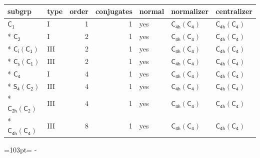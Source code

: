 \documentclass[10pt,a4paper]{article}
\newcommand{\needspace}[1]{\par\penalty-100\begingroup\dimen0=#1\relax\dimen2=\pagegoal
  \advance\dimen2-\pagetotal\ifdim\dimen0>\dimen2\relax\ifdim\dimen2>0pt\vfil\break\fi\fi
  \endgroup}
\numberwithin{equation}{section}
\newcommand{\grp}[1]{\mathsf{#1}}
\begin{document}
{\small\begin{longtable}{@{}llrrlll@{}}\toprule
subgrp & type & order & conjugates & normal & normalizer & centralizer\\\midrule\endhead
\bottomrule\endfoot\endlastfoot
\href{../../../rotation/data/pdf/C1.pdf}{$\grp{C_{1}}$} & I & 1 & 1 & yes & \href{C4h-C4.pdf}{$\grp{C_{4h}}(\grp{C_{4}})$} & \href{C4h-C4.pdf}{$\grp{C_{4h}}(\grp{C_{4}})$}\\*
\href{../../../rotation/data/pdf/C2.pdf}{$\grp{C_{2}}$} & I & 2 & 1 & yes & \href{C4h-C4.pdf}{$\grp{C_{4h}}(\grp{C_{4}})$} & \href{C4h-C4.pdf}{$\grp{C_{4h}}(\grp{C_{4}})$}\\*
\href{S2-C1.pdf}{$\grp{C_{i}}(\grp{C_{1}})$} & III & 2 & 1 & yes & \href{C4h-C4.pdf}{$\grp{C_{4h}}(\grp{C_{4}})$} & \href{C4h-C4.pdf}{$\grp{C_{4h}}(\grp{C_{4}})$}\\*
\href{C1v-C1.pdf}{$\grp{C_{s}}(\grp{C_{1}})$} & III & 2 & 1 & yes & \href{C4h-C4.pdf}{$\grp{C_{4h}}(\grp{C_{4}})$} & \href{C4h-C4.pdf}{$\grp{C_{4h}}(\grp{C_{4}})$}\\*
\href{../../../rotation/data/pdf/C4.pdf}{$\grp{C_{4}}$} & I & 4 & 1 & yes & \href{C4h-C4.pdf}{$\grp{C_{4h}}(\grp{C_{4}})$} & \href{C4h-C4.pdf}{$\grp{C_{4h}}(\grp{C_{4}})$}\\*
\href{S4-C2.pdf}{$\grp{S_{4}}(\grp{C_{2}})$} & III & 4 & 1 & yes & \href{C4h-C4.pdf}{$\grp{C_{4h}}(\grp{C_{4}})$} & \href{C4h-C4.pdf}{$\grp{C_{4h}}(\grp{C_{4}})$}\\*
\href{C2h-C2.pdf}{$\grp{C_{2h}}(\grp{C_{2}})$} & III & 4 & 1 & yes & \href{C4h-C4.pdf}{$\grp{C_{4h}}(\grp{C_{4}})$} & \href{C4h-C4.pdf}{$\grp{C_{4h}}(\grp{C_{4}})$}\\*
\href{C4h-C4.pdf}{$\grp{C_{4h}}(\grp{C_{4}})$} & III & 8 & 1 & yes & \href{C4h-C4.pdf}{$\grp{C_{4h}}(\grp{C_{4}})$} & \href{C4h-C4.pdf}{$\grp{C_{4h}}(\grp{C_{4}})$}\\
\bottomrule\end{longtable}}
\needspace{103pt}
\end{document}
